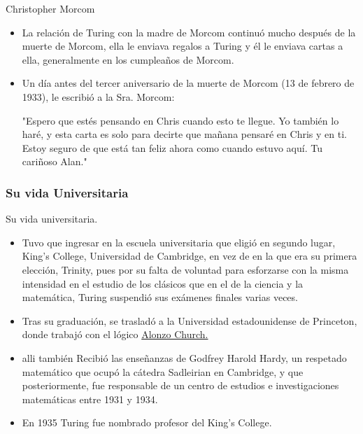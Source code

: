 \documentclass{beamer}
\begin{document}
\begin{frame}{Christopher Morcom}
    \begin{itemize}
        \item La relación de Turing con la madre de Morcom continuó mucho después de la muerte de Morcom, ella le enviava regalos a Turing y él le enviava cartas a ella, generalmente en los cumpleaños de Morcom.\pause
        \item Un día antes del tercer aniversario de la muerte de Morcom (13 de febrero de 1933), le escribió a la Sra. Morcom:\\\pause
        \begin{center}
            "Espero que estés pensando en Chris cuando esto te llegue. Yo también lo haré, y esta carta es solo para decirte que mañana pensaré en Chris y en ti. Estoy seguro de que está tan feliz ahora como cuando estuvo aquí. Tu cariñoso Alan."
        \end{center}
    \end{itemize}    
\end{frame}
\subsubsection{Su vida Universitaria}
\begin{frame}{Su vida universitaria.}
    \begin{itemize}
        \item Tuvo que ingresar en la escuela universitaria que eligió en segundo lugar, King's College, Universidad de Cambridge, en vez de en la que era su primera elección, Trinity,  pues por su falta de voluntad para esforzarse con la misma intensidad en el estudio de los clásicos que en el de la ciencia y la matemática, Turing suspendió sus exámenes finales varias veces.\pause
        \item Tras su graduación, se trasladó a la Universidad estadounidense de Princeton, donde trabajó con el lógico \href{https://es.wikipedia.org/wiki/Alonzo_Church}{Alonzo Church.}\pause
        \item alli también Recibió las enseñanzas de Godfrey Harold Hardy, un respetado matemático que ocupó la cátedra Sadleirian en Cambridge, y que posteriormente, fue responsable de un centro de estudios e investigaciones matemáticas entre 1931 y 1934.\pause
        \item En 1935 Turing fue nombrado profesor del King's College.
    \end{itemize}
\end{frame}
\end{document}
